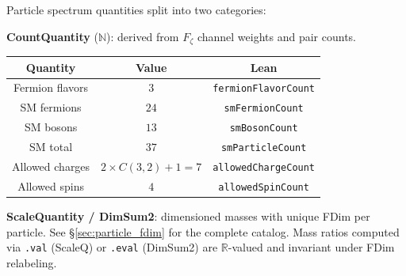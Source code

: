 Particle spectrum quantities split into two categories:

\textbf{CountQuantity} ($\mathbb{N}$): derived from $F_\zeta$ channel weights and pair counts.

\begin{center}
\begin{tabular}{|c|c|c|}
\hline
Quantity & Value & Lean \\
\hline
Fermion flavors & $3$ & \texttt{fermionFlavorCount} \\
SM fermions & $24$ & \texttt{smFermionCount} \\
SM bosons & $13$ & \texttt{smBosonCount} \\
SM total & $37$ & \texttt{smParticleCount} \\
Allowed charges & $2 \times C(3,2) + 1 = 7$ & \texttt{allowedChargeCount} \\
Allowed spins & $4$ & \texttt{allowedSpinCount} \\
\hline
\end{tabular}
\end{center}

\textbf{ScaleQuantity / DimSum2}: dimensioned masses with unique FDim per particle.
See \S\ref{sec:particle_fdim} for the complete catalog.
Mass ratios computed via \texttt{.val} (ScaleQ) or \texttt{.eval} (DimSum2) are $\mathbb{R}$-valued
and invariant under FDim relabeling.
